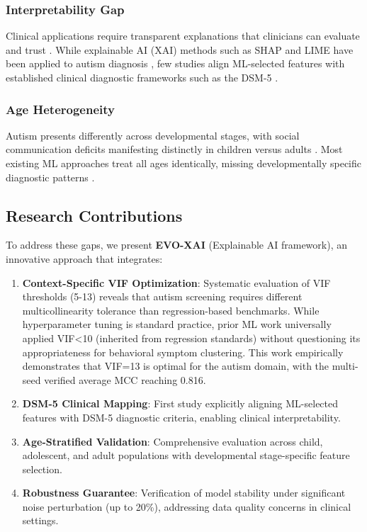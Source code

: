 \subsubsection{Interpretability Gap}

Clinical applications require transparent explanations that clinicians can evaluate and trust \cite{ref16}. While explainable AI (XAI) methods such as SHAP \cite{ref17} and LIME \cite{ref18} have been applied to autism diagnosis \cite{ref19,ref20,ref21}, few studies align ML-selected features with established clinical diagnostic frameworks such as the DSM-5 \cite{ref1}.

\subsubsection{Age Heterogeneity}

Autism presents differently across developmental stages, with social communication deficits manifesting distinctly in children versus adults \cite{ref22}. Most existing ML approaches treat all ages identically, missing developmentally specific diagnostic patterns \cite{ref23}.

\subsection{Research Contributions}\label{research-contributions-1}

To address these gaps, we present \textbf{EVO-XAI} (Explainable AI framework), an innovative approach that integrates:

\begin{enumerate}
\def\labelenumi{\arabic{enumi}.}
\item
  \textbf{Context-Specific VIF Optimization}: Systematic evaluation of VIF thresholds (5-13) reveals that autism screening requires different multicollinearity tolerance than regression-based benchmarks. While hyperparameter tuning is standard practice, prior ML work universally applied VIF\textless10 (inherited from regression standards) without questioning its appropriateness for behavioral symptom clustering. This work empirically demonstrates that VIF=13 is optimal for the autism domain, with the multi-seed verified average MCC reaching 0.816.
\item
  \textbf{DSM-5 Clinical Mapping}: First study explicitly aligning ML-selected features with DSM-5 diagnostic criteria, enabling clinical interpretability.
\item
  \textbf{Age-Stratified Validation}: Comprehensive evaluation across child, adolescent, and adult populations with developmental stage-specific feature selection.
\item
  \textbf{Robustness Guarantee}: Verification of model stability under significant noise perturbation (up to 20\%), addressing data quality concerns in clinical settings.
\end{enumerate}

